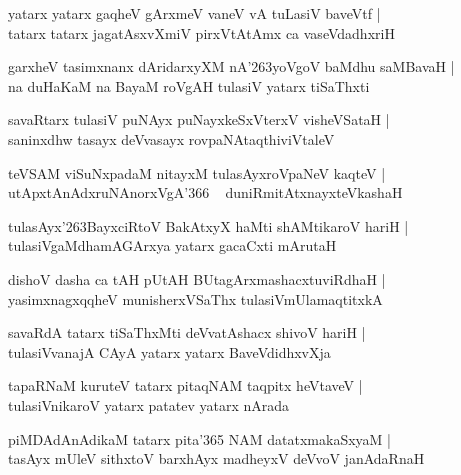 \documentclass[twoside,12pt,openright]{book}
\def\S{\char'263}
\newcounter{shloka}[chapter]
\begin{document}
\begin{shloka}%
yatarx yatarx gaqheV gArxmeV vaneV vA tuLasiV baveVtf |\\
tatarx tatarx jagatAsxvXmiV pirxVtAtAmx ca vaseVdadhxriH 
\end{shloka}

\begin{shloka}%
garxheV tasimxnanx dAridarxyXM nA\S yoVgoV baMdhu saMBavaH |\\
na duHaKaM na BayaM roVgAH tulasiV yatarx tiSaThxti
\end{shloka}

\begin{shloka}%
savaRtarx tulasiV puNAyx puNayxkeSxVterxV visheVSataH |\\
saninxdhw tasayx deVvasayx rovpaNAtaqthiviVtaleV
\end{shloka}

\begin{shloka}%
teVSAM viSuNxpadaM nitayxM tulasAyxroVpaNeV kaqteV |\\
utApxtAnAdxruNAnorxVgA\char'366 ~ duniRmitAtxnayxteVkashaH 
\end{shloka}

\begin{shloka}%
tulasAyx\S BayxciRtoV BakAtxyX haMti shAMtikaroV hariH |\\
tulasiVgaMdhamAGArxya yatarx gacaCxti mArutaH
\end{shloka}

\begin{shloka}%
dishoV dasha ca tAH pUtAH BUtagArxmashacxtuviRdhaH |\\
yasimxnagxqqheV munisherxVSaThx tulasiVmUlamaqtitxkA 
\end{shloka}

\begin{shloka}%
savaRdA tatarx tiSaThxMti deVvatAshacx shivoV hariH |\\
tulasiVvanajA CAyA yatarx yatarx BaveVdidhxvXja 
\end{shloka}

\begin{shloka}%
tapaRNaM kuruteV tatarx pitaqNAM taqpitx heVtaveV |\\
tulasiVnikaroV yatarx patatev yatarx nArada
\end{shloka}

\begin{shloka}%
piMDAdAnAdikaM tatarx pita\char'365 NAM datatxmakaSxyaM |\\
tasAyx mUleV sithxtoV barxhAyx madheyxV deVvoV janAdaRnaH 
\end{shloka}
\end{document}
